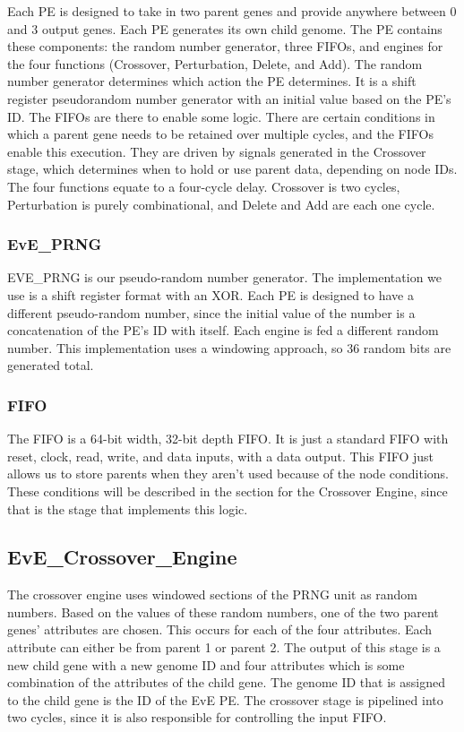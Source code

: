 \documentclass[preprint,pre,floats,aps,amsmath,amssymb]{revtex4}
\begin{document}
Each PE is designed to take in two parent genes and provide anywhere between 0 and 3 output genes. Each PE generates its own child genome. The PE contains these components: the random number generator, three FIFOs, and engines for the four functions (Crossover, Perturbation, Delete, and Add). The random number generator determines which action the PE determines. It is a shift register pseudorandom number generator with an initial value based on the PE’s ID. The FIFOs are there to enable some logic. There are certain conditions in which a parent gene needs to be retained over multiple cycles, and the FIFOs enable this execution. They are driven by signals generated in the Crossover stage, which determines when to hold or use parent data, depending on node IDs. The four functions equate to a four-cycle delay. Crossover is two cycles, Perturbation is purely combinational, and Delete and Add are each one cycle.


\subsubsection{EvE\_PRNG}

EVE\_PRNG is our pseudo-random number generator. The implementation we use is a shift register format with an XOR. Each PE is designed to have a different pseudo-random number, since the initial value of the number is a concatenation of the PE’s ID with itself. Each engine is fed a different random number. This implementation uses a windowing approach, so 36 random bits are generated total.

\subsubsection{FIFO}

The FIFO is a 64-bit width, 32-bit depth FIFO. It is just a standard FIFO with reset, clock, read, write, and data inputs, with a data output. This FIFO just allows us to store parents when they aren’t used because of the node conditions. These conditions will be described in the section for the Crossover Engine, since that is the stage that implements this logic.

\subsection{EvE\_Crossover\_Engine}

The crossover engine uses windowed sections of the PRNG unit as random numbers. Based on the values of these random numbers, one of the two parent genes’ attributes are chosen. This occurs for each of the four attributes. Each attribute can either be from parent 1 or parent 2. The output of this stage is a new child gene with a new genome ID and four attributes which is some combination of the attributes of the child gene. The genome ID that is assigned to the child gene is the ID of the EvE PE. The crossover stage is pipelined into two cycles, since it is also responsible for controlling the input FIFO.
\end{document}
